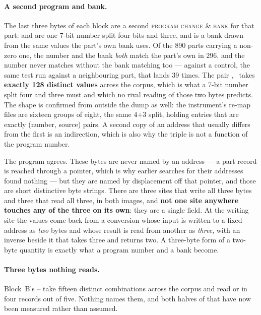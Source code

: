   \paragraph{A second program and bank.} The last three bytes of each block are a second \textsc{program change \&
  bank} for that part:  and  are one 7-bit number split four bits
  and three, and  is a bank drawn from the same values the part's own bank
  uses. Of the 890 parts carrying a non-zero one, the number and the bank \emph{both}
  match the part's own in 296, and the number never matches without the bank matching too
  --- against a control, the same test run against a neighbouring part, that lands 39
  times. The pair ,~ takes \textbf{exactly 128 distinct values}
  across the corpus, which is what a 7-bit number split four and three must and which no
  rival reading of those two bytes predicts. The shape is confirmed from outside the dump
  as well: the instrument's re-map files are sixteen groups of eight, the same 4+3 split,
  holding entries that are exactly (number, source) pairs. A second copy of an address
  that usually differs from the first is an indirection, which is also why the triple is
  not a function of the program number.

  The program agrees. These bytes are never named by an address --- a part record is
  reached through a pointer, which is why earlier searches for their addresses found
  nothing --- but they are named by displacement off that pointer, and those are short
  distinctive byte strings. There are three sites that write all three bytes and three
  that read all three, in both images, and \textbf{not one site anywhere touches any of
  the three on its own}: they are a single field. At the writing site the values come back
  from a conversion whose input is written to a fixed address as \emph{two} bytes and
  whose result is read from another as \emph{three}, with an inverse beside it that takes
  three and returns two. A three-byte form of a two-byte quantity is exactly what a program
  number and a bank become.

  \paragraph{Three bytes nothing reads.} Block~B's -- take fifteen distinct combinations
  across the corpus and read  or  in four records out of
  five. Nothing names them, and both halves of that have now been measured rather than
  assumed.

